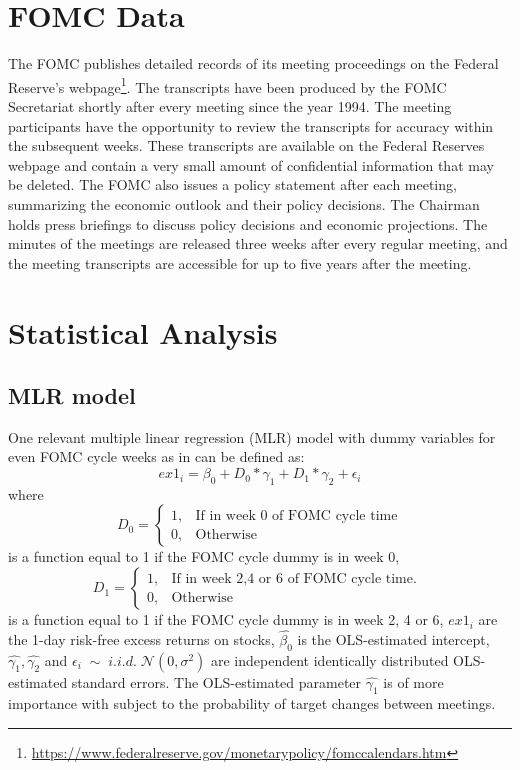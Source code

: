 \section{FOMC Data}

The FOMC publishes detailed records of its meeting proceedings on the Federal Reserve's webpage\footnote{\url{https://www.federalreserve.gov/monetarypolicy/fomccalendars.htm}}.  
The transcripts have been produced by the FOMC Secretariat shortly after every meeting since the year 1994.
The meeting participants have the opportunity to review the transcripts for accuracy within the subsequent weeks. 
These transcripts are available on the Federal Reserves webpage and contain a very small amount of confidential information that may be deleted. 
The FOMC also issues a policy statement after each meeting,  summarizing the economic outlook and their policy decisions. 
The Chairman holds press briefings to discuss policy decisions and economic projections. 
The minutes of the meetings are released three weeks after every regular meeting, and the meeting transcripts are accessible for up to five years after the meeting.

\section{Statistical Analysis}

\subsection{MLR model}

One relevant multiple linear regression (MLR) model with dummy variables for even FOMC cycle weeks as in \parencite{cieslak_stock_2019} can be defined as:
\begin{equation}
	ex1_{i}=\beta_{0}+D_0*\gamma_{1}+D_1*\gamma_{2}+\epsilon_i
\end{equation}
where
\begin{equation}
    D_0=
    \begin{cases}
      1, & \text{If in week 0 of FOMC cycle time}\\
      0, & \text{Otherwise}
    \end{cases}
\end{equation}
is a function equal to 1 if the FOMC cycle dummy is in week 0,
\begin{equation}
    D_1=
    \begin{cases}
      1, & \text{If in week 2,4 or 6 of FOMC cycle time. } \\
      0, & \text{Otherwise}
    \end{cases}
\end{equation}
is a function equal to 1 if the FOMC cycle dummy is in week 2,  4 or 6,
$ {ex1_{i}} $ are the 1-day risk-free excess returns on stocks,
$ { \hat{\beta_{0}} } $ is the OLS-estimated intercept,
$ { \hat{\gamma_{1}}, \hat{\gamma_{2}} } $   and
$ { \epsilon_i \; \sim \; i.i.d.  \; \mathcal{N}\left(0, \sigma^2 \right) } $
are independent identically distributed OLS-estimated standard errors. 
The OLS-estimated parameter $ {\hat{\gamma_{1}}} $ is of more importance with subject to the probability of target changes between meetings.

